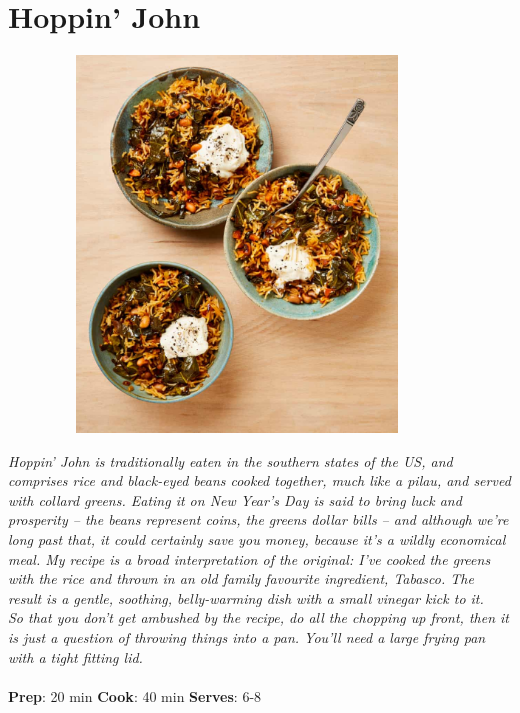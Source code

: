 \documentclass{book}
\begin{document}
\section{Hoppin’ John}
\begin{figure}
\centering\includegraphics[width=10cm,height=10cm,keepaspectratio]{Recipe_Pictures/Hoppin_John.png}
\end{figure}
\emph{Hoppin’ John is traditionally eaten in the southern states of the US, and comprises rice and black-eyed beans cooked together, much like a pilau, and served with collard greens. Eating it on New Year’s Day is said to bring luck and prosperity – the beans represent coins, the greens dollar bills – and although we’re long past that, it could certainly save you money, because it’s a wildly economical meal. My recipe is a broad interpretation of the original: I’ve cooked the greens with the rice and thrown in an old family favourite ingredient, Tabasco. The result is a gentle, soothing, belly-warming dish with a small vinegar kick to it.\\ 
So that you don’t get ambushed by the recipe, do all the chopping up front, then it is just a question of throwing things into a pan. You’ll need a large frying pan with a tight fitting lid.}\\\\ 
\textbf{Prep}: 20 min
\textbf{Cook}: 40 min
\textbf{Serves}: 6-8
\end{document}
